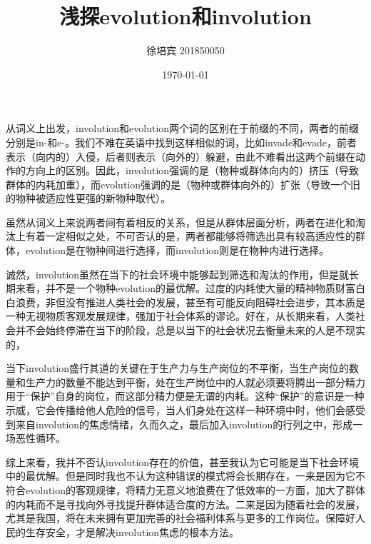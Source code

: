 \documentclass[UTF8]{article}
\title{浅探evolution和involution}
\author{徐培宾 201850050}
\date{\today}
\begin{document}
    \maketitle
    从词义上出发，involution和evolution两个词的区别在于前缀的不同，两者的前缀分别是in-和e-。我们不难在英语中找到这样相似的词，比如invade和evade，前者表示（向内的）入侵，后者则表示（向外的）躲避，由此不难看出这两个前缀在动作的方向上的区别。因此，involution强调的是（物种或群体向内的）挤压（导致群体的内耗加重），而evolution强调的是（物种或群体向外的）扩张（导致一个旧的物种被适应性更强的新物种取代）。

    虽然从词义上来说两者间有着相反的关系，但是从群体层面分析，两者在进化和淘汰上有着一定相似之处，不可否认的是，两者都能够将筛选出具有较高适应性的群体，evolution是在物种间进行选择，而involution则是在物种内进行选择。

    诚然，involution虽然在当下的社会环境中能够起到筛选和淘汰的作用，但是就长期来看，并不是一个物种evolution的最优解。过度的内耗使大量的精神物质财富白白浪费，非但没有推进人类社会的发展，甚至有可能反向阻碍社会进步，其本质是一种无视物质客观发展规律，强加于社会体系的谬论。好在，从长期来看，人类社会并不会始终停滞在当下的阶段，总是以当下的社会状况去衡量未来的人是不现实的，

    当下involution盛行其道的关键在于生产力与生产岗位的不平衡，当生产岗位的数量和生产力的数量不能达到平衡，处在生产岗位中的人就必须要将腾出一部分精力用于“保护”自身的岗位，而这部分精力便是无谓的内耗。这种“保护”的意识是一种示威，它会传播给他人危险的信号，当人们身处在这样一种环境中时，他们会感受到来自involution的焦虑情绪，久而久之，最后加入involution的行列之中，形成一场恶性循环。

    综上来看，我并不否认involution存在的价值，甚至我认为它可能是当下社会环境中的最优解。但是同时我也不认为这种错误的模式将会长期存在，一来是因为它不符合evolution的客观规律，将精力无意义地浪费在了低效率的一方面，加大了群体的内耗而不是寻找向外寻找提升群体适合度的方法。二来是因为随着社会的发展，尤其是我国，将在未来拥有更加完善的社会福利体系与更多的工作岗位。保障好人民的生存安全，才是解决involution焦虑的根本方法。
\end{document}
